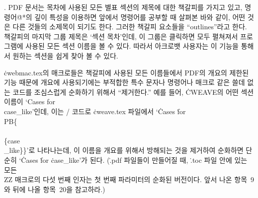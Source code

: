 {%
. {\mc PDF} 문서는 목차에 사용된 모든 별표 섹션의 제목에 대한
책갈피를 가지고 있고, 명령어\.{@*}의 깊이 특성을 이용하면
앞에서 명령어를 공부할 때 살펴본 바와 같이, 어떤 것은 다른 것들의
소제목이 되기도 한다. 그러한 책갈피 요소들을 
``outlines''라고 한다. 책갈피의 마지막 그룹 제목은 `섹션 목차'인데,
이 그룹은 클릭하면 모두 펼쳐져서 프로그램에 사용된 모든
섹션 이름을 볼 수 있다. 따라서 아크로뱃 사용자는 이 기능을 통해서
원하는 섹션을 쉽게 찾아 볼 수 있다. 

\.{cwebmac.tex}의 매크로들은 책갈피에
사용된 모든 이름들에서 {\mc PDF}의 개요의 제한된 기능 때문에 개요에 사용되기에는 부적합한
특수 문자나 명령어나 매크로 같은 쓸데 없는 코드를 조심스럽게 순화하기 위해서 ``제거한다.''
예를 들어, \.{CWEAVE}의 어떤 섹션 이름이 `Cases for \\{case\_like}'인데, 이는 \TEX/
코드로 \.{cweave.tex} 파일에서 `\.{Cases} \.{for}
\.{\\PB\{\\\\\{case\\\_like\}\}}'로 나타나는데, 이 이름을 개요를 위해서 방해되는 것을
제거하여 순화하면 단순히 `\.{Cases} \.{for} \.{case\_like}'가 된다. 
(\.{.pdf} 파일들이 만들어질 때, \.{.toc} 파일 안에 있는 모든 \.{\\ZZ}
매크로의 다섯 번째 인자는 첫 번째 파라미터의 순화된 버전이다. 앞서 나온
항목~9와 뒤에 나올 항목~20을 참고하라.)

}
